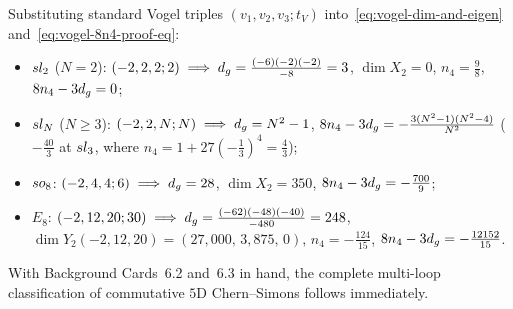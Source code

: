 \begin{example}
\label{ex:vogel-benchmarks}
Substituting standard Vogel triples $(v_1,v_2,v_3; t_V)$ into~\eqref{eq:vogel-dim-and-eigen} and~\eqref{eq:vogel-8n4-proof-eq}:
\begin{itemize}[leftmargin=*]
  \item $sl_2$ ($N=2$): $(-2, 2, 2; 2) \implies d_{g} = \frac{(-6)(-2)(-2)}{-8} = 3$, $\dim X_2 = 0$, $n_4 = \frac{9}{8}$, $8n_4 - 3d_{g} = 0$;
  \item $sl_N$ ($N \ge 3$): $(-2, 2, N; N) \implies d_{g} = N^2 - 1$, $8n_4 - 3d_{g} = -\frac{3(N^2-1)(N^2-4)}{N^2}$ ($-\frac{40}{3}$ at $sl_3$, where $n_4 = 1 + 27(-\frac{1}{3})^4 = \frac{4}{3}$);
  \item $so_8$: $(-2, 4, 4; 6) \implies d_{g} = 28$, $\dim X_2 = 350$, $8n_4 - 3d_{g} = -\frac{700}{9}$;
  \item $E_8$: $(-2, 12, 20; 30) \implies d_{g} = \frac{(-62)(-48)(-40)}{-480} = 248$, $\dim Y_2(-2,12,20) = (27{,}000,\,3{,}875,\,0)$, $n_4 = -\frac{124}{15}$, $8n_4 - 3d_{g} = -\frac{12152}{15}$.
\end{itemize}
\end{example}

With Background Cards~6.2 and~6.3 in hand, the complete multi-loop classification of commutative $5\mathrm{D}$ Chern--Simons follows immediately.

